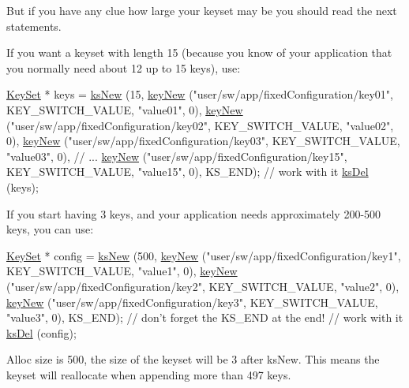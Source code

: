 But if you have any clue how large your keyset may be you should read the next statements.

If you want a keyset with length 15 (because you know of your application that you normally need about 12 up to 15 keys), use\-: 
\begin{DoxyCode}
\hyperlink{classkdb_1_1KeySet_a4eac9850fa4f06c07a5306befc3e4377}{KeySet} * keys = \hyperlink{group__keyset_ga671e1aaee3ae9dc13b4834a4ddbd2c3c}{ksNew} (15,
        \hyperlink{group__key_gad23c65b44bf48d773759e1f9a4d43b89}{keyNew} (\textcolor{stringliteral}{"user/sw/app/fixedConfiguration/key01"}, KEY\_SWITCH\_VALUE,
       \textcolor{stringliteral}{"value01"}, 0),
        \hyperlink{group__key_gad23c65b44bf48d773759e1f9a4d43b89}{keyNew} (\textcolor{stringliteral}{"user/sw/app/fixedConfiguration/key02"}, KEY\_SWITCH\_VALUE,
       \textcolor{stringliteral}{"value02"}, 0),
        \hyperlink{group__key_gad23c65b44bf48d773759e1f9a4d43b89}{keyNew} (\textcolor{stringliteral}{"user/sw/app/fixedConfiguration/key03"}, KEY\_SWITCH\_VALUE,
       \textcolor{stringliteral}{"value03"}, 0),
        \textcolor{comment}{// ...}
        \hyperlink{group__key_gad23c65b44bf48d773759e1f9a4d43b89}{keyNew} (\textcolor{stringliteral}{"user/sw/app/fixedConfiguration/key15"}, KEY\_SWITCH\_VALUE,
       \textcolor{stringliteral}{"value15"}, 0),
        KS\_END);
\textcolor{comment}{// work with it}
\hyperlink{group__keyset_ga27e5c16473b02a422238c8d970db7ac8}{ksDel} (keys);
\end{DoxyCode}


If you start having 3 keys, and your application needs approximately 200-\/500 keys, you can use\-: 
\begin{DoxyCode}
\hyperlink{classkdb_1_1KeySet_a4eac9850fa4f06c07a5306befc3e4377}{KeySet} * config = \hyperlink{group__keyset_ga671e1aaee3ae9dc13b4834a4ddbd2c3c}{ksNew} (500,
        \hyperlink{group__key_gad23c65b44bf48d773759e1f9a4d43b89}{keyNew} (\textcolor{stringliteral}{"user/sw/app/fixedConfiguration/key1"}, KEY\_SWITCH\_VALUE, \textcolor{stringliteral}{
      "value1"}, 0),
        \hyperlink{group__key_gad23c65b44bf48d773759e1f9a4d43b89}{keyNew} (\textcolor{stringliteral}{"user/sw/app/fixedConfiguration/key2"}, KEY\_SWITCH\_VALUE, \textcolor{stringliteral}{
      "value2"}, 0),
        \hyperlink{group__key_gad23c65b44bf48d773759e1f9a4d43b89}{keyNew} (\textcolor{stringliteral}{"user/sw/app/fixedConfiguration/key3"}, KEY\_SWITCH\_VALUE, \textcolor{stringliteral}{
      "value3"}, 0),
        KS\_END); \textcolor{comment}{// don't forget the KS\_END at the end!}
\textcolor{comment}{// work with it}
\hyperlink{group__keyset_ga27e5c16473b02a422238c8d970db7ac8}{ksDel} (config);
\end{DoxyCode}
 Alloc size is 500, the size of the keyset will be 3 after ks\-New. This means the keyset will reallocate when appending more than 497 keys.

